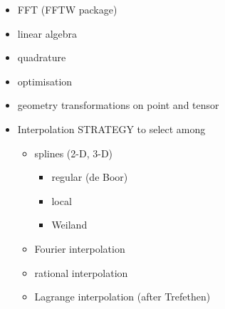 \begin{itemize}
\item
  FFT (FFTW package)
\item
  linear algebra
\item
  quadrature
\item
  optimisation
\item
  geometry transformations on point and tensor
\item
  Interpolation STRATEGY to select among

  \begin{itemize}
  \item
    splines (2-D, 3-D)

    \begin{itemize}
    \item
      regular (de Boor)
    \item
      local
    \item
      Weiland
    \end{itemize}
  \item
    Fourier interpolation
  \item
    rational interpolation
  \item
    Lagrange interpolation (after Trefethen)
  \end{itemize}
\end{itemize}
